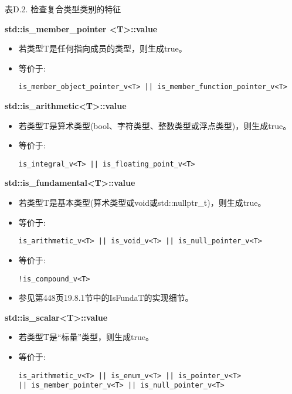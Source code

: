 \begin{center}
表D.2. 检查复合类型类别的特征
\end{center}

\textbf{std::is\_member\_pointer <T>::value}

\begin{itemize}
\item 
若类型T是任何指向成员的类型，则生成true。

\item 
等价于: 
\begin{lstlisting}[style=styleCXX]
is_member_object_pointer_v<T> || is_member_function_pointer_v<T>
\end{lstlisting}
\end{itemize}

\textbf{std::is\_arithmetic<T>::value}

\begin{itemize}
\item 
若类型T是算术类型(bool、字符类型、整数类型或浮点类型)，则生成true。

\item 
等价于: 
\begin{lstlisting}[style=styleCXX]
is_integral_v<T> || is_floating_point_v<T>
\end{lstlisting}
\end{itemize}

\textbf{std::is\_fundamental<T>::value}

\begin{itemize}
\item 
若类型T是基本类型(算术类型或void或std::nullptr\_t)，则生成true。

\item 
等价于: 
\begin{lstlisting}[style=styleCXX]
is_arithmetic_v<T> || is_void_v<T> || is_null_pointer_v<T>
\end{lstlisting}

\item 
等价于: 
\begin{lstlisting}[style=styleCXX]
!is_compound_v<T>
\end{lstlisting}

\item 
参见第448页19.8.1节中的IsFundaT的实现细节。
\end{itemize}

\textbf{std::is\_scalar<T>::value}

\begin{itemize}
\item 
若类型T是“标量”类型，则生成true。

\item 
等价于:  
\begin{lstlisting}[style=styleCXX]
is_arithmetic_v<T> || is_enum_v<T> || is_pointer_v<T>
|| is_member_pointer_v<T> || is_null_pointer_v<T>
\end{lstlisting}
\end{itemize}

